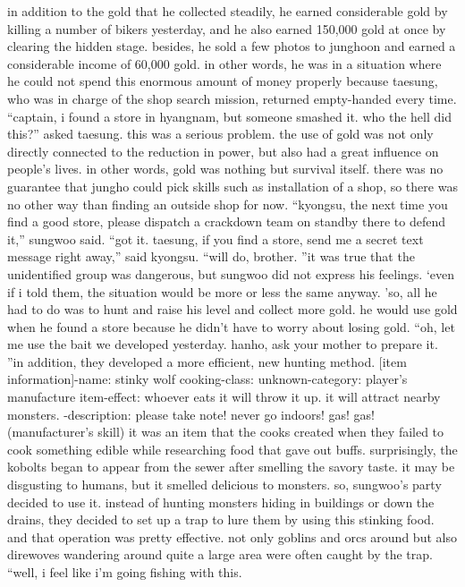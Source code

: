  in addition to the gold that he collected steadily, he earned considerable gold by killing a number of bikers yesterday, and he also earned 150,000 gold at once by clearing the hidden stage.
besides, he sold a few photos to junghoon and earned a considerable income of 60,000 gold.
in other words, he was in a situation where he could not spend this enormous amount of money properly because taesung, who was in charge of the shop search mission, returned empty-handed every time.
“captain, i found a store in hyangnam, but someone smashed it.
 who the hell did this?” asked taesung.
this was a serious problem.
 the use of gold was not only directly connected to the reduction in power, but also had a great influence on people’s lives.
 in other words, gold was nothing but survival itself.
there was no guarantee that jungho could pick skills such as installation of a shop, so there was no other way than finding an outside shop for now.
“kyongsu, the next time you find a good store, please dispatch a crackdown team on standby there to defend it,” sungwoo said.
“got it.
 taesung, if you find a store, send me a secret text message right away,” said kyongsu.
“will do, brother.
”it was true that the unidentified group was dangerous, but sungwoo did not express his feelings.
‘even if i told them, the situation would be more or less the same anyway.
’so, all he had to do was to hunt and raise his level and collect more gold.
 he would use gold when he found a store because he didn’t have to worry about losing gold.
“oh, let me use the bait we developed yesterday.
 hanho, ask your mother to prepare it.
”in addition, they developed a more efficient, new hunting method.
[item information]-name: stinky wolf cooking-class: unknown-category: player’s manufacture item-effect: whoever eats it will throw it up.
 it will attract nearby monsters.
-description: please take note! never go indoors! gas! gas! (manufacturer’s skill)
it was an item that the cooks created when they failed to cook something edible while researching food that gave out buffs.
surprisingly, the kobolts began to appear from the sewer after smelling the savory taste.
 it may be disgusting to humans, but it smelled delicious to monsters.
so, sungwoo’s party decided to use it.
 instead of hunting monsters hiding in buildings or down the drains, they decided to set up a trap to lure them by using this stinking food.
and that operation was pretty effective.
 not only goblins and orcs around but also direwoves wandering around quite a large area were often caught by the trap.
“well, i feel like i’m going fishing with this.
